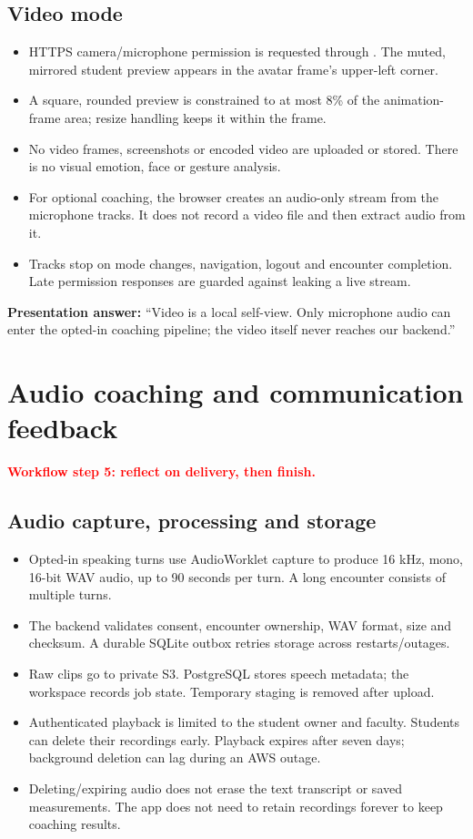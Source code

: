 \documentclass[10pt,letterpaper]{article}
\newcommand{\code}[1]{\texttt{\detokenize{#1}}}
\newcommand{\callout}[1]{\par\vspace{5pt}\noindent\colorbox{pale}{\parbox{\dimexpr\linewidth-2\fboxsep\relax}{\small #1}}\par\vspace{5pt}}
\newcommand{\page}[2]{\clearpage\section{#1}\textcolor{red}{\textbf{#2}}\par}
\begin{document}
\subsection*{Video mode}
\begin{itemize}
\item HTTPS camera/microphone permission is requested through \code{getUserMedia}. The muted, mirrored student preview appears in the avatar frame's upper-left corner.
\item A square, rounded preview is constrained to at most 8\% of the animation-frame area; resize handling keeps it within the frame.
\item No video frames, screenshots or encoded video are uploaded or stored. There is no visual emotion, face or gesture analysis.
\item For optional coaching, the browser creates an audio-only stream from the microphone tracks. It does not record a video file and then extract audio from it.
\item Tracks stop on mode changes, navigation, logout and encounter completion. Late permission responses are guarded against leaking a live stream.
\end{itemize}
\callout{\textbf{Presentation answer:} ``Video is a local self-view. Only microphone audio can enter the opted-in coaching pipeline; the video itself never reaches our backend.''}

\page{Audio coaching and communication feedback}{Workflow step 5: reflect on delivery, then finish.}
\subsection*{Audio capture, processing and storage}
\begin{itemize}
\item Opted-in speaking turns use AudioWorklet capture to produce 16 kHz, mono, 16-bit WAV audio, up to 90 seconds per turn. A long encounter consists of multiple turns.
\item The backend validates consent, encounter ownership, WAV format, size and checksum. A durable SQLite outbox retries storage across restarts/outages.
\item Raw clips go to private S3. PostgreSQL stores speech metadata; the workspace records job state. Temporary staging is removed after upload.
\item Authenticated playback is limited to the student owner and faculty. Students can delete their recordings early. Playback expires after seven days; background deletion can lag during an AWS outage.
\item Deleting/expiring audio does not erase the text transcript or saved measurements. The app does not need to retain recordings forever to keep coaching results.
\end{itemize}
\end{document}
